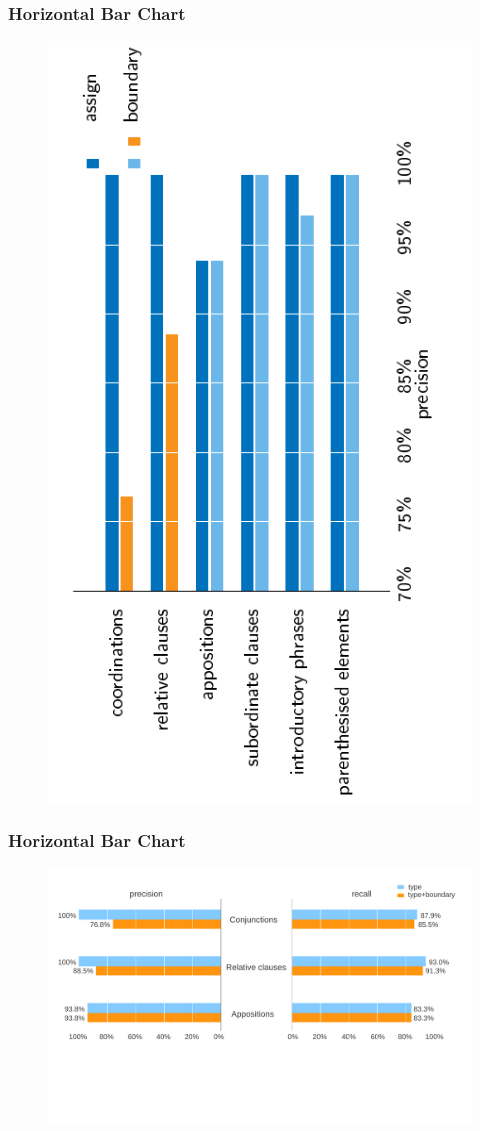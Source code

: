 \documentclass{beamer}
\begin{document}
\begin{frame}[label=bar,fragile]
\frametitle{Horizontal Bar Chart}
\begin{figure}
\vspace*{-2em}
\centering
\includegraphics[height=\textwidth,angle=-90]{fvaluemodify.pdf}
\end{figure}
\end{frame}

\begin{frame}[label=bar2,fragile]
\frametitle{Horizontal Bar Chart}
\begin{figure}
\centering
\includegraphics[width=\textwidth]{precision7.pdf}
\end{figure}
\end{frame}
\end{document}
